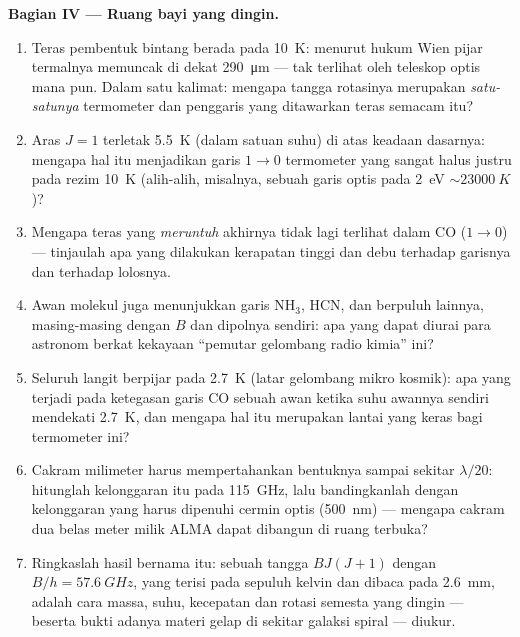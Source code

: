 \begin{problem}
\medskip\noindent\textbf{Bagian IV --- Ruang bayi yang dingin.}
\begin{enumerate}[resume]
  \item Teras pembentuk bintang berada pada \qty{10}{K}: menurut hukum
        Wien pijar termalnya memuncak di dekat \qty{290}{\micro m} ---
        tak terlihat oleh teleskop optis mana pun. Dalam satu kalimat:
        mengapa tangga rotasinya merupakan \emph{satu-satunya} termometer
        dan penggaris yang ditawarkan teras semacam itu?
  \item Aras $J = 1$ terletak \qty{5.5}{K} (dalam satuan suhu) di atas
        keadaan dasarnya: mengapa hal itu menjadikan garis $1\to0$
        termometer yang sangat halus justru pada rezim \qty{10}{K}
        (alih-alih, misalnya, sebuah garis optis pada
        \qty{2}{eV} $\sim \qty{23000}{K}$)?
  \item Mengapa teras yang \emph{meruntuh} akhirnya tidak lagi terlihat
        dalam CO ($1\to0$) --- tinjaulah apa yang dilakukan kerapatan
        tinggi dan debu terhadap garisnya dan terhadap lolosnya.
  \item Awan molekul juga menunjukkan garis NH$_3$, HCN, dan berpuluh
        lainnya, masing-masing dengan $B$ dan dipolnya sendiri: apa yang
        dapat diurai para astronom berkat kekayaan ``pemutar gelombang
        radio kimia'' ini?
  \item Seluruh langit berpijar pada \qty{2.7}{K} (latar gelombang
        mikro kosmik): apa yang terjadi pada ketegasan garis CO sebuah
        awan ketika suhu awannya sendiri mendekati
        \qty{2.7}{K}, dan mengapa hal itu merupakan lantai yang keras
        bagi termometer ini?
  \item Cakram milimeter harus mempertahankan bentuknya sampai sekitar
        $\lambda/20$: hitunglah kelonggaran itu pada \qty{115}{GHz},
        lalu bandingkanlah dengan kelonggaran yang harus dipenuhi cermin
        optis (\qty{500}{nm}) --- mengapa cakram dua belas meter milik
        ALMA dapat dibangun di ruang terbuka?
  \item Ringkaslah hasil bernama itu: sebuah tangga $BJ(J+1)$ dengan $B/h =
        \qty{57.6}{GHz}$, yang terisi pada sepuluh kelvin dan dibaca pada
        \qty{2.6}{mm}, adalah cara massa, suhu, kecepatan dan rotasi
        semesta yang dingin --- beserta bukti adanya materi gelap di
        sekitar galaksi spiral --- diukur.
\end{enumerate}
\end{problem}
